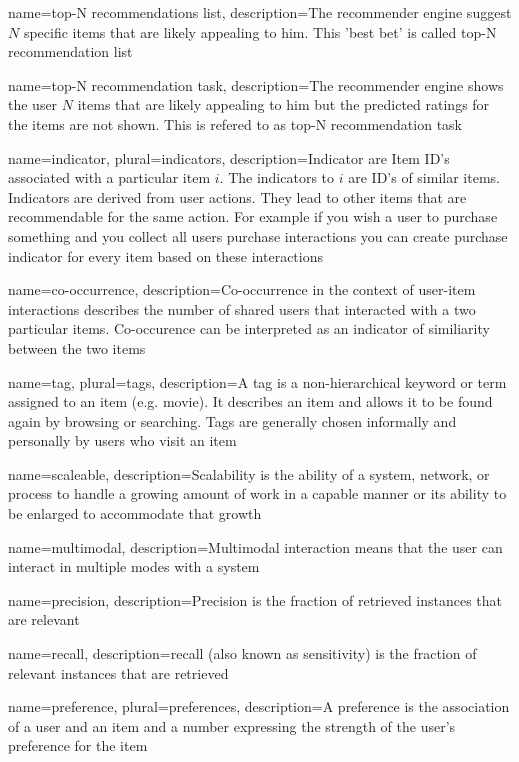 {
name=top-N recommendations list,
description={The recommender engine suggest $N$ specific items that are likely appealing to him. This 'best bet' is called top-N recommendation list}
}

{
name=top-N recommendation task,
description={The recommender engine shows the user $N$ items that are likely appealing to him but the predicted ratings for the items are not shown. This is refered to as top-N recommendation task}
}


{
name={indicator},
plural={indicators},
description={Indicator are Item ID's associated with a particular item $i$. The indicators to $i$ are  ID's of similar items. Indicators are derived from user actions. They lead to other items that are recommendable for the same action. For example if you wish a user to purchase something and you collect all users purchase interactions you can create purchase indicator for every item based on these interactions}
}

{
name={co-occur\-rence},
description={Co-occurrence in the context of user-item interactions describes the number of shared users that interacted with a two particular items. Co-occurence can be interpreted as an indicator of similiarity between the two items}
}

{
name={tag},
plural={tags},
description={A tag is a non-hierarchical keyword or term assigned to an item (e.g. movie). It describes an item and allows it to be found again by browsing or searching. Tags are generally chosen informally and personally by users who visit an item}
}

{
name={scaleable},
description={Scalability is the ability of a system, network, or process to handle a growing amount of work in a capable manner or its ability to be enlarged to accommodate that growth}
}

{
name={multimodal},
description={Multimodal interaction means that the user can interact in multiple modes with a system}
}

{
name={precision},
description={Precision is the fraction of retrieved instances that are relevant}
}

{
name={recall},
description={recall (also known as sensitivity) is the fraction of relevant instances that are retrieve}d 
}

{
name={preference},
plural={preferences},
description={A preference is the association of a user and an item and a number expressing the strength of the user's preference for the item}
}

